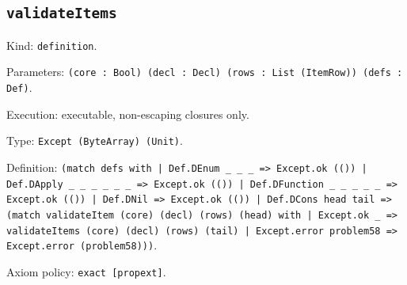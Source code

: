 \documentclass[11pt]{article}
\begin{document}
\subsection*{\texttt{validateItems}}
\noindent Kind: \texttt{definition}.\par
\noindent Parameters: \texttt{(core : Bool) (decl : Decl) (rows : List (ItemRow)) (defs : Def)}.\par
\noindent Execution: executable, non-escaping closures only.\par
\noindent Type: \texttt{Except (ByteArray) (Unit)}.\par
\noindent Definition: \texttt{(match defs with | Def.DEnum \_ \_ \_ => Except.ok (()) | Def.DApply \_ \_ \_ \_ \_ \_ => Except.ok (()) | Def.DFunction \_ \_ \_ \_ \_ => Except.ok (()) | Def.DNil => Except.ok (()) | Def.DCons head tail => (match validateItem (core) (decl) (rows) (head) with | Except.ok \_ => validateItems (core) (decl) (rows) (tail) | Except.error problem58 => Except.error (problem58)))}.\par
\noindent Axiom policy: \texttt{exact [propext]}.\par
\end{document}
